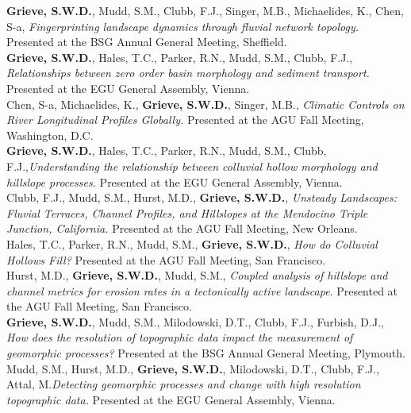 \documentclass[10pt, a4paper]{article}
\newcommand{\years}[1]{\marginnote{\scriptsize #1}}
\begin{document}
\years{2019}\textbf{Grieve, S.W.D.}, Mudd, S.M., Clubb, F.J., Singer, M.B., Michaelides, K., Chen, S-a, \textit{Fingerprinting landscape dynamics through fluvial network topology.} Presented at the BSG Annual General Meeting, Sheffield.\\[0.05cm]

\years{2019}\textbf{Grieve, S.W.D.}, Hales, T.C., Parker, R.N., Mudd, S.M., Clubb, F.J., \textit{Relationships between zero order basin morphology and sediment transport.} Presented at the EGU General Assembly, Vienna.\\[0.05cm]

\years{2018}Chen, S-a, Michaelides, K., \textbf{Grieve, S.W.D.}, Singer, M.B., \textit{Climatic Controls on River Longitudinal Profiles Globally.} Presented at the AGU Fall Meeting, Washington, D.C.\\[0.05cm]

\years{2018}\textbf{Grieve, S.W.D.}, Hales, T.C., Parker, R.N., Mudd, S.M., Clubb, F.J.,\textit{Understanding the relationship between colluvial hollow morphology and hillslope processes.} Presented at the EGU General Assembly, Vienna.\\[0.05cm]

\years{2017}Clubb, F.J., Mudd, S.M., Hurst, M.D., \textbf{Grieve, S.W.D.}, \textit{Unsteady Landscapes: Fluvial Terraces, Channel Profiles, and Hillslopes at the Mendocino Triple Junction, California.} Presented at the AGU Fall Meeting, New Orleans.\\[0.05cm]

\years{2016}Hales, T.C., Parker, R.N., Mudd, S.M., \textbf{Grieve, S.W.D.}, \textit{How do Colluvial Hollows Fill?} Presented at the AGU Fall Meeting, San Francisco.\\[0.05cm]

\years{2016}Hurst, M.D., \textbf{Grieve, S.W.D.}, Mudd, S.M., \textit{Coupled analysis of hillslope and channel metrics for erosion rates in a tectonically active landscape}. Presented at the AGU Fall Meeting, San Francisco.\\[0.05cm]

\years{2016}\textbf{Grieve, S.W.D.}, Mudd, S.M., Milodowski, D.T., Clubb, F.J., Furbish, D.J., \textit{How does the resolution of topographic data impact the measurement of geomorphic processes?} Presented at the BSG Annual General Meeting, Plymouth.\\[0.05cm]

\years{2016}Mudd, S.M., Hurst, M.D., \textbf{Grieve, S.W.D.}, Milodowski, D.T., Clubb, F.J., Attal, M.\textit{Detecting geomorphic processes and change with high resolution topographic data.} Presented at the EGU General Assembly, Vienna.\\[0.05cm]
\end{document}
